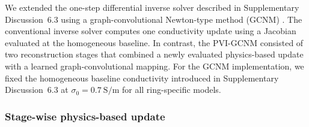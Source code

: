 \documentclass[11pt]{article}
\begin{document}
\begingroup


We extended the one-step differential inverse solver described in Supplementary Discussion~6.3 using a graph-convolutional Newton-type method (GCNM) \cite{Herzberg2021GCNM}.
The conventional inverse solver computes one conductivity update using a Jacobian evaluated at the homogeneous baseline.
In contrast, the PVI-GCNM consisted of two reconstruction stages that combined a newly evaluated physics-based update with a learned graph-convolutional mapping.
For the GCNM implementation, we fixed the homogeneous baseline conductivity introduced in Supplementary Discussion~6.3 at $\sigma_0=0.7~\mathrm{S/m}$ for all ring-specific models.

\subsubsection{Stage-wise physics-based update}
\end{document}
